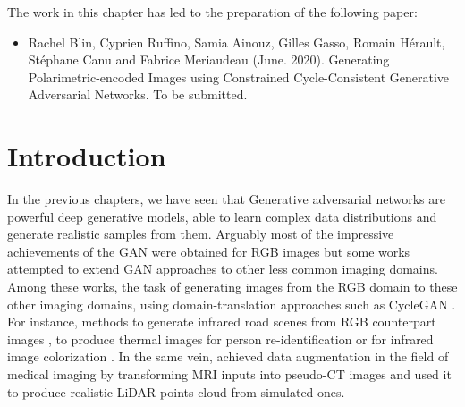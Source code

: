\clearpage

The work in this chapter has led to the preparation of the following paper: 
\begin{itemize}
	\item Rachel Blin, Cyprien Ruffino, Samia Ainouz,  Gilles Gasso, Romain H\'erault, St\'ephane Canu and Fabrice Meriaudeau (June. 2020). Generating Polarimetric-encoded Images using Constrained Cycle-Consistent Generative Adversarial Networks.
	To be submitted.
\end{itemize}

\setcounter{minitocdepth}{3}
\minitoc
\setcounter{minitocdepth}{2}

\section{Introduction}


In the previous chapters, we have seen that Generative  adversarial networks \citep{Goodfellow2014} are powerful deep generative models, able to learn complex data distributions and generate realistic samples from them. Arguably most of the impressive achievements of the \ac{GAN} were obtained for \ac{RGB} images but some works attempted to extend \ac{GAN} approaches to other less common imaging domains. Among these works, the task of generating images from the \ac{RGB} domain to these other imaging domains, using domain-translation approaches such as \ac{CycleGAN} \citep{Zhu2017a}. For instance, methods to generate infrared road scenes from \ac{RGB} counterpart images \citep{Zhang2018b}, to produce thermal images for person re-identification \citep{Kniaz2018} or for infrared image colorization \citep{Mehri2019}. In the same vein, \citet{Nie2017} achieved data augmentation in the field of medical imaging by transforming MRI inputs into pseudo-CT images and \citet{Sallab2019} used it to produce realistic \ac{LiDAR} points cloud from simulated ones. 

